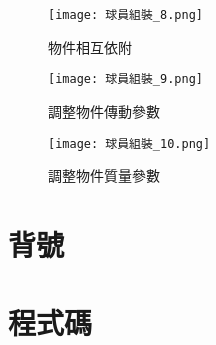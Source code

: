 \begin{figure}[h]
  \begin{center}
    \texttt{[image: 球員組裝\_8.png]}
  \end{center}
  \caption{物件相互依附}
  \label{fig:photo}
\end{figure}
\begin{figure}[h]
  \begin{center}
    \texttt{[image: 球員組裝\_9.png]}
  \end{center}
  \caption{調整物件傳動參數}
  \label{fig:photo}
\end{figure}
\begin{figure}[h]
  \begin{center}
    \texttt{[image: 球員組裝\_10.png]}
  \end{center}
  \caption{調整物件質量參數}
  \label{fig:photo}
\end{figure}

\section{背號}

\section{程式碼}
